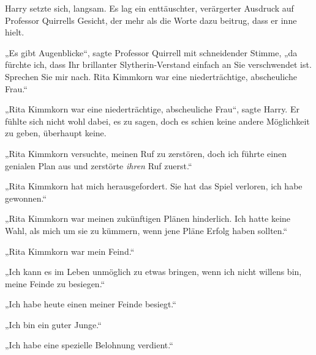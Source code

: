 Harry setzte sich, langsam. Es lag ein enttäuschter, verärgerter Ausdruck auf Professor Quirrells Gesicht, der mehr als die Worte dazu beitrug, dass er inne hielt.

„Es gibt Augenblicke“, sagte Professor Quirrell mit schneidender Stimme, „da fürchte ich, dass Ihr brillanter Slytherin-Verstand einfach an Sie verschwendet ist. Sprechen Sie mir nach. Rita Kimmkorn war eine niederträchtige, abscheuliche Frau.“

„Rita Kimmkorn war eine niederträchtige, abscheuliche Frau“, sagte Harry. Er fühlte sich nicht wohl dabei, es zu sagen, doch es schien keine andere Möglichkeit zu geben, überhaupt keine.

„Rita Kimmkorn versuchte, meinen Ruf zu zerstören, doch ich führte einen genialen Plan aus und zerstörte \emph{ihren} Ruf zuerst.“

„Rita Kimmkorn hat mich herausgefordert. Sie hat das Spiel verloren, ich habe gewonnen.“

„Rita Kimmkorn war meinen zukünftigen Plänen hinderlich. Ich hatte keine Wahl, als mich um sie zu kümmern, wenn jene Pläne Erfolg haben sollten.“

„Rita Kimmkorn war mein Feind.“

„Ich kann es im Leben unmöglich zu etwas bringen, wenn ich nicht willens bin, meine Feinde zu besiegen.“

„Ich habe heute einen meiner Feinde besiegt.“

„Ich bin ein guter Junge.“

„Ich habe eine spezielle Belohnung verdient.“

